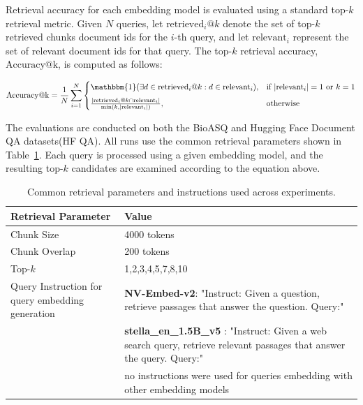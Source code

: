 \documentclass{scrartcl}
\begin{document}
Retrieval accuracy for each embedding model is evaluated using a standard top-$k$ retrieval metric. Given $N$ queries, let $\text{retrieved}_i@k$ denote the set of top-$k$ retrieved chunks document ids for the $i$-th query, and let $\text{relevant}_i$ represent the set of relevant document ids for that query. The top-$k$ retrieval accuracy, $\text{Accuracy@k}$, is computed as follows:

\begin{equation}
\text{Accuracy@k} = \frac{1}{N} \sum_{i=1}^{N} 
    \begin{cases}
      \mathbbm{1}(\exists d \in \text{retrieved}_i@k : d \in \text{relevant}_i), & \text{if } |\text{relevant}_i| = 1 \text{ or } k = 1 \\[6pt]
      \frac{|\text{retrieved}_i@k \cap \text{relevant}_i|}{\min(k, |\text{relevant}_i|)}, & \text{otherwise}
    \end{cases}
\end{equation}

The evaluations are conducted on both the BioASQ and Hugging Face Document QA datasets(HF QA). All runs use the common retrieval parameters shown in Table~\ref{table:retrieval_params}. Each query is processed using a given embedding model, and the resulting top-$k$ candidates are examined according to the equation above.

\begin{table}[H]
\centering
\begin{tabular}{|p{5cm}|p{10cm}|}
\hline
\textbf{Retrieval Parameter} & \textbf{Value} \\
\hline
Chunk Size & 4000 tokens \\
Chunk Overlap & 200 tokens \\
Top-$k$ & 1,2,3,4,5,7,8,10 \\
Query Instruction for query embedding generation & \textbf{NV-Embed-v2}: "Instruct: Given a question, retrieve passages that answer the question. Query:" \\ 
~ & \textbf{stella\_en\_1.5B\_v5 }: "Instruct: Given a web search query, retrieve relevant passages that answer the query. Query:" \\
~ & no instructions were used for queries embedding with  other embedding models\\
\hline
\end{tabular}
\caption{Common retrieval parameters and instructions used across experiments.}
\label{table:retrieval_params}
\end{table}
\end{document}
